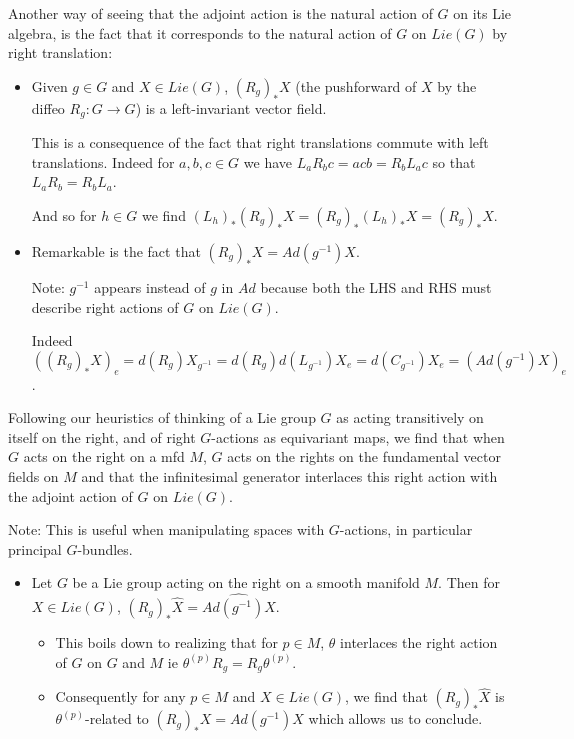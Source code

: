 \documentclass{report}
\theoremstyle{definition}
\begin{document}
Another way of seeing that the adjoint action is the natural action of $G$ on its Lie algebra, is the fact that it corresponds to the natural action of $G$ on $Lie(G)$ by right translation:
\begin{itemize}
    \item Given $g\in G$ and $X\in Lie(G)$, $(R_g)_*X$ (the pushforward of $X$ by the diffeo $R_g:G\to G$) is a left-invariant vector field. 
    
    This is a consequence of the fact that right translations commute with left translations. Indeed for $a,b,c\in G$ we have $L_aR_bc=acb=R_bL_ac$ so that $L_aR_b=R_bL_a$.

    And so for $h\in G$ we find $(L_h)_*(R_g)_*X=(R_g)_*(L_h)_*X=(R_g)_*X$.
    \item Remarkable is the fact that $(R_g)_*X=Ad(g^{-1})X$.

    Note: $g^{-1}$ appears instead of $g$ in $Ad$ because both the LHS and RHS must describe right actions of $G$ on $Lie(G)$.

    Indeed $((R_g)_*X)_e=d(R_g)X_{g^{-1}}=d(R_g)d(L_{g^{-1}})X_e=d(C_{g^{-1}})X_e=(Ad(g^{-1})X)_e$.
\end{itemize}

Following our heuristics of thinking of a Lie group $G$ as acting transitively on itself on the right, and of right $G$-actions as equivariant maps, we find that when $G$ acts on the right on a mfd $M$, $G$ acts on the rights on the fundamental vector fields on $M$ and that the infinitesimal generator interlaces this right action with the adjoint action of $G$ on $Lie(G)$.

Note: This is useful when manipulating spaces with $G$-actions, in particular principal $G$-bundles.

\begin{itemize}
    \item\label{AdjointRepresentationFundamentalVectorField} Let $G$ be a Lie group acting on the right on a smooth manifold $M$. Then for $X\in Lie(G)$, $(R_g)_*\hat{X}=\widehat{Ad(g^{-1})X}$.

    \begin{itemize}
        \item This boils down to realizing that for $p\in M$, $\theta$ interlaces the right action of $G$ on $G$ and $M$ ie $\theta^{(p)}R_g=R_g\theta^{(p)}$.
        \item Consequently for any $p\in M$ and $X\in Lie(G)$, we find that $(R_g)_*\hat{X}$ is $\theta^{(p)}$-related to $(R_g)_*X=Ad(g^{-1})X$ which allows us to conclude.
    \end{itemize}
\end{itemize}
\end{document}
